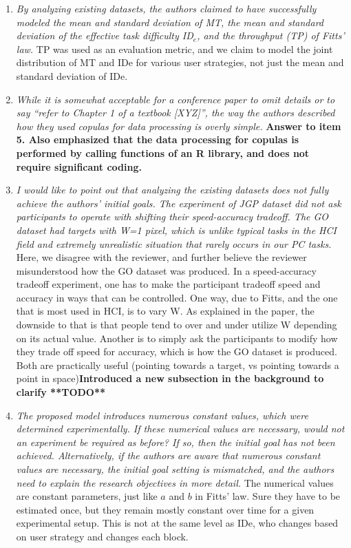 \documentclass{article}
\begin{document}
\begin{enumerate}
    \item \textit{By analyzing existing datasets, the authors claimed to have successfully modeled the mean and standard deviation of MT, the mean and standard deviation of the effective task difficulty ID$_e$, and the throughput (TP) of Fitts' law.} TP was used as an evaluation metric, and we claim to model the joint distribution of MT and IDe for various user strategies, not just the mean and standard deviation of IDe. 
    \item \textit{ While it is somewhat acceptable for a conference paper to omit details or to say “refer to Chapter 1 of a textbook [XYZ]”, the way the authors described how they used copulas for data processing is overly simple.} \textbf{Answer to item 5. Also emphasized that the data processing for copulas is performed by calling functions of an R library, and does not require significant coding.}
    \item \textit{I would like to point out that analyzing the existing datasets does not fully achieve the authors' initial goals. The experiment of JGP dataset did not ask participants to operate with shifting their speed-accuracy tradeoff. The GO dataset had targets with W=1 pixel, which is unlike typical tasks in the HCI field and extremely unrealistic situation
    that rarely occurs in our PC tasks.} Here, we disagree with the reviewer, and further believe the reviewer misunderstood how the GO dataset was produced. In a speed-accuracy tradeoff experiment, one has to make the participant tradeoff speed and accuracy in ways that can be controlled. One way, due to Fitts, and the one that is most used in HCI, is to vary W. As explained in the paper, the downside to that is that people tend to over and under utilize W depending on its actual value. Another is to simply ask the participants to modify how they trade off speed for accuracy, which is how the GO dataset is produced. Both are practically useful (pointing towards a target, vs pointing towards a point in space)\textbf{Introduced a new subsection in the background to clarify **TODO**}
    \item \textit{The proposed model introduces numerous constant values, which were determined experimentally. If these numerical values are necessary, would not an experiment be required as before? If so, then the initial goal has not been achieved. Alternatively, if the authors are aware that numerous constant values are necessary, the initial goal setting is mismatched, and the authors need to explain the research objectives in more detail.} The numerical values are constant parameters, just like $a$ and $b$ in Fitts' law. Sure they have to be estimated once, but they remain mostly constant over time for a given experimental setup. This is not at the same level as IDe, who changes based on user strategy and changes each block.

\end{enumerate}
\end{document}
